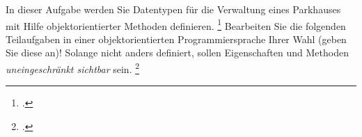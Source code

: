 \documentclass{bschlangaul-aufgabe}
\begin{document}

In dieser Aufgabe werden Sie Datentypen für die Verwaltung eines
Parkhauses mit Hilfe objektorientierter Methoden
definieren.
\footcite[Thema 2 Teilaufgabe 2 Aufgabe 1 Seite 11]{examen:66116:2014:03} Bearbeiten
Sie die folgenden Teilaufgaben in einer objektorientierten
Programmiersprache Ihrer Wahl (geben Sie diese an)! Solange nicht anders
definiert, sollen Eigenschaften und Methoden \emph{uneingeschränkt
sichtbar} sein.
\footcite[Aufgabenblatt 1: Abstrakte Klassen, Interface, Rekursion, Seite 2, Aufgabe 1]{aud:ab:1}
\end{document}
